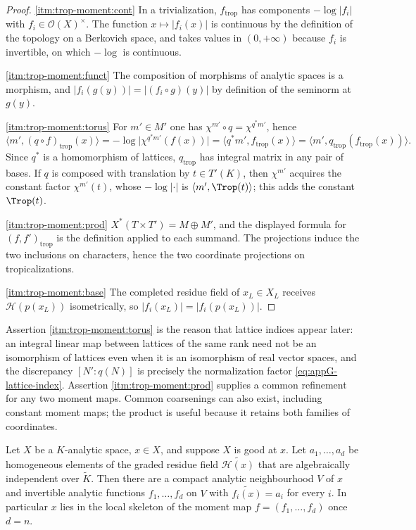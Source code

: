 \begin{proof}
\cref{itm:trop-moment:cont} In a trivialization, $f_{\mathrm{trop}}$ has
components $-\log|f_i|$ with $f_i\in\mathcal O(X)^\times$. The function
$x\mapsto|f_i(x)|$ is continuous by the definition of the topology on a
Berkovich space, and takes values in $(0,+\infty)$ because $f_i$ is
invertible, on which $-\log$ is continuous.

\cref{itm:trop-moment:funct} The composition of morphisms of analytic
spaces is a morphism, and $|f_i(g(y))|=|(f_i\circ g)(y)|$ by definition of
the seminorm at $g(y)$.

\cref{itm:trop-moment:torus} For $m'\in M'$ one has
$\chi^{m'}\circ q=\chi^{q^*m'}$, hence
\[
 \langle m',(q\circ f)_{\mathrm{trop}}(x)\rangle
 =-\log\bigl|\chi^{q^*m'}(f(x))\bigr|
 =\langle q^*m',f_{\mathrm{trop}}(x)\rangle
 =\langle m',q_{\mathrm{trop}}(f_{\mathrm{trop}}(x))\rangle .
\]
Since $q^*$ is a homomorphism of lattices, $q_{\mathrm{trop}}$ has integral
matrix in any pair of bases. If $q$ is composed with translation by
$t\in T'(K)$, then $\chi^{m'}$ acquires the constant factor $\chi^{m'}(t)$,
whose $-\log|\cdot|$ is $\langle m',\Trop(t)\rangle$; this adds the constant
$\Trop(t)$.

\cref{itm:trop-moment:prod} $X^*(T\times T')=M\oplus M'$, and the
displayed formula for $(f,f')_{\mathrm{trop}}$ is the definition applied to
each summand. The projections induce the two inclusions on characters,
hence the two coordinate projections on tropicalizations.

\cref{itm:trop-moment:base} The completed residue field of $x_L\in X_L$
receives $\mathcal H(p(x_L))$ isometrically, so
$|f_i(x_L)|=|f_i(p(x_L))|$.
\end{proof}

Assertion \cref{itm:trop-moment:torus} is the reason that lattice indices
appear later: an integral linear map between lattices of the same rank need
not be an isomorphism of lattices even when it is an isomorphism of real
vector spaces, and the discrepancy $[N':q(N)]$ is precisely the
normalization factor \eqref{eq:appG-lattice-index}. Assertion
\cref{itm:trop-moment:prod} supplies a common refinement for any two moment
maps. Common coarsenings can also exist, including constant moment maps;
the product is useful because it retains both families of coordinates.

\begin{lemma}
\label{lem:trop-moment-local-existence}
Let $X$ be a $K$-analytic space, $x\in X$, and suppose $X$ is good at $x$.
Let $a_1,\ldots,a_d$ be homogeneous elements of the graded residue field
$\widetilde{\mathcal H(x)}$ that are algebraically independent over
$\widetilde K$. Then there are a compact analytic neighbourhood $V$ of $x$
and invertible analytic functions $f_1,\ldots,f_d$ on $V$ with
$\widetilde{f_i(x)}=a_i$ for every $i$. In particular $x$ lies in the local
skeleton of the moment map $f=(f_1,\ldots,f_d)$ once $d=n$.
\end{lemma}

